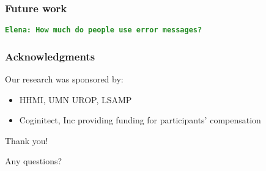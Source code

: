 \documentclass{beamer}
\newcommand{\comment}[1]{{\bf \tt  {#1}}}
\newcommand{\emcomment}[1]{\textcolor{ForestGreen}{\comment{Elena: {#1}}}}
\begin{document}
\begin{frame}
\frametitle{Future work}
\emcomment{How much do people use error messages?}
\end{frame}

\begin{frame}
\frametitle{Acknowledgments}
	Our research was sponsored by:
	\begin{itemize}
	\item HHMI, UMN UROP, LSAMP
        \item Coginitect, Inc providing funding for participants' compensation 
	\end{itemize}
	{\centering
	\noindent
	Thank you! \par
	Any questions? \par
	}
\end{frame}
\end{document}
